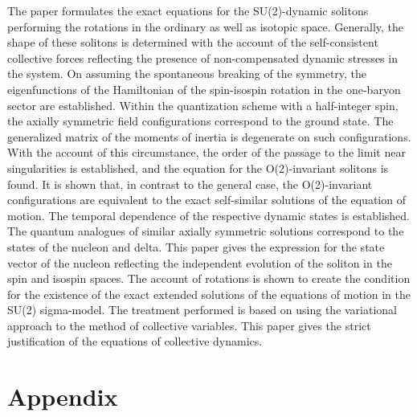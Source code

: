 \documentclass[a4paper,12pt]{article}
\begin{document}
The paper formulates the exact equations for the SU(2)-dynamic
solitons performing the rotations in the ordinary as well as
isotopic space. Generally, the shape of these solitons is
determined with the account of the self-consistent collective
forces reflecting the presence of non-compensated dynamic stresses
in the system. On assuming the spontaneous breaking of the
symmetry, the eigenfunctions of the Hamiltonian of the
spin-isospin rotation in the one-baryon sector are established.
Within the quantization scheme with a half-integer spin, the
axially symmetric field configurations correspond to the ground
state. The generalized matrix of the moments of inertia is
degenerate on such configurations. With the account of this
circumstance, the order of the passage to the limit near
singularities is established, and the equation for the
O(2)-invariant solitons is found. It is shown that, in contrast to
the general case, the O(2)-invariant configurations are equivalent
to the exact self-similar solutions of the equation of motion. The
temporal dependence of the respective dynamic states is
established. The quantum analogues of similar axially symmetric
solutions correspond to the states of the nucleon and delta. This
paper gives the expression for the state vector of the nucleon
reflecting the independent evolution of the soliton in the spin
and isospin spaces. The account of rotations is shown to create
the condition for the existence of the exact extended solutions of
the equations of motion in the SU(2) sigma-model. The treatment
performed is based on using the variational approach to the method
of collective variables. This paper gives the strict justification
of the equations of collective dynamics. %

\vspace{12pt}


\section*{Appendix}
\renewcommand{\theequation}{A.\arabic{equation}}
\setcounter{equation}{0}
\end{document}
